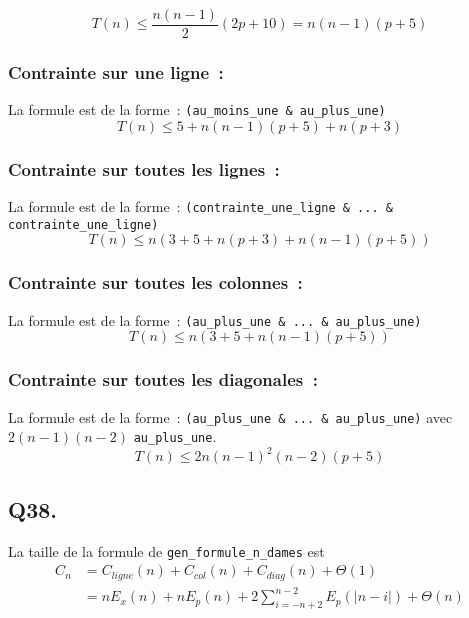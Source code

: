 \begin{equation*}
    T(n) \le \frac{n(n-1)}{2}(2p + 10) = n(n-1)(p+5)
\end{equation*}
\subsubsection*{Contrainte sur une ligne~:}
La formule est de la forme~: \verb|(au_moins_une & au_plus_une)|
\begin{equation*}
   T(n) \le 5 + n(n-1)(p+5) + n(p+3)
\end{equation*}

\subsubsection*{Contrainte sur toutes les lignes~:}
La formule est de la forme~: \verb|(contrainte_une_ligne & ... & contrainte_une_ligne)|
\begin{equation*}
   T(n) \le n(3 + 5 + n(p+3) + n(n-1)(p+5))
\end{equation*}

\subsubsection*{Contrainte sur toutes les colonnes~:}
La formule est de la forme~: \verb|(au_plus_une & ... & au_plus_une)|
\begin{equation*}
   T(n) \le n(3 + 5 + n(n-1)(p+5))
\end{equation*}

\subsubsection*{Contrainte sur toutes les diagonales~:}
La formule est de la forme~: \verb|(au_plus_une & ... & au_plus_une)|
avec $2(n-1)(n-2)$ \verb|au_plus_une|.
\begin{equation*}
    T(n) \le 2n(n-1)^2(n-2)(p+5)
\end{equation*}

\subsection*{Q38.}
La taille de la formule de \verb|gen_formule_n_dames| est
\begin{align*}
    C_n &= C_{ligne}(n) + C_{col}(n) + C_{diag}(n) + \Theta(1)\\
    &= nE_x(n) + nE_p(n) + 2\sum_{i=-n+2}^{n-2}E_p(|n-i|) + \Theta(n)\\
\end{align*}

